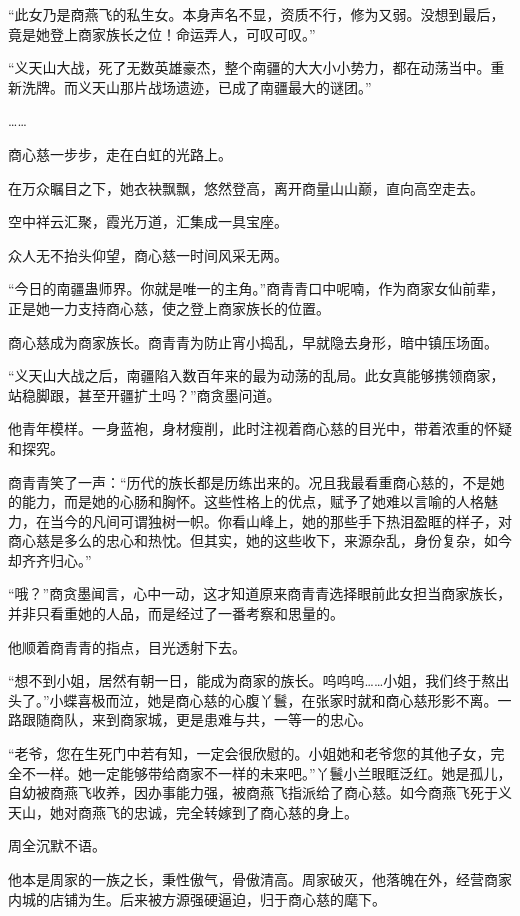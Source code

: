 \begin{this_body}
“此女乃是商燕飞的私生女。本身声名不显，资质不行，修为又弱。没想到最后，竟是她登上商家族长之位！命运弄人，可叹可叹。”

“义天山大战，死了无数英雄豪杰，整个南疆的大大小小势力，都在动荡当中。重新洗牌。而义天山那片战场遗迹，已成了南疆最大的谜团。”

……

商心慈一步步，走在白虹的光路上。

在万众瞩目之下，她衣袂飘飘，悠然登高，离开商量山山巅，直向高空走去。

空中祥云汇聚，霞光万道，汇集成一具宝座。

众人无不抬头仰望，商心慈一时间风采无两。

“今日的南疆蛊师界。你就是唯一的主角。”商青青口中呢喃，作为商家女仙前辈，正是她一力支持商心慈，使之登上商家族长的位置。

商心慈成为商家族长。商青青为防止宵小捣乱，早就隐去身形，暗中镇压场面。

“义天山大战之后，南疆陷入数百年来的最为动荡的乱局。此女真能够携领商家，站稳脚跟，甚至开疆扩土吗？”商贪墨问道。

他青年模样。一身蓝袍，身材瘦削，此时注视着商心慈的目光中，带着浓重的怀疑和探究。

商青青笑了一声：“历代的族长都是历练出来的。况且我最看重商心慈的，不是她的能力，而是她的心肠和胸怀。这些性格上的优点，赋予了她难以言喻的人格魅力，在当今的凡间可谓独树一帜。你看山峰上，她的那些手下热泪盈眶的样子，对商心慈是多么的忠心和热忱。但其实，她的这些收下，来源杂乱，身份复杂，如今却齐齐归心。”

“哦？”商贪墨闻言，心中一动，这才知道原来商青青选择眼前此女担当商家族长，并非只看重她的人品，而是经过了一番考察和思量的。

他顺着商青青的指点，目光透射下去。

“想不到小姐，居然有朝一日，能成为商家的族长。呜呜呜……小姐，我们终于熬出头了。”小蝶喜极而泣，她是商心慈的心腹丫鬟，在张家时就和商心慈形影不离。一路跟随商队，来到商家城，更是患难与共，一等一的忠心。

“老爷，您在生死门中若有知，一定会很欣慰的。小姐她和老爷您的其他子女，完全不一样。她一定能够带给商家不一样的未来吧。”丫鬟小兰眼眶泛红。她是孤儿，自幼被商燕飞收养，因办事能力强，被商燕飞指派给了商心慈。如今商燕飞死于义天山，她对商燕飞的忠诚，完全转嫁到了商心慈的身上。

周全沉默不语。

他本是周家的一族之长，秉性傲气，骨傲清高。周家破灭，他落魄在外，经营商家内城的店铺为生。后来被方源强硬逼迫，归于商心慈的麾下。


\end{this_body}
